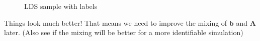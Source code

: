 \documentclass[]{article}
\begin{document}
\begin{figure}[h!]
	\caption{LDS sample with labels}
	\label{fig:LDS labeled revisit}
\end{figure}

Things look much better! That means we need to improve the mixing of \(\mathbf{b}\) and \(\mathbf{A}\) later. (Also see if the mixing will be better for a more identifiable simulation)

\clearpage
\end{document}
